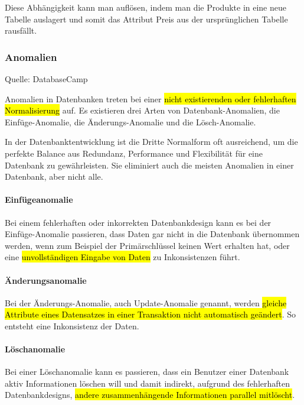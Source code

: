 Diese Abhängigkeit kann man auflösen, indem man die Produkte in eine neue Tabelle auslagert und somit das Attribut Preis aus der ursprünglichen Tabelle rausfällt.

\subsubsection{Anomalien}
\label{sec:Anomalien}

Quelle: DatabaseCamp \cite{anomalien}

Anomalien in Datenbanken treten bei einer \hl{nicht existierenden oder fehlerhaften Normalisierung} auf.
Es existieren drei Arten von Datenbank-Anomalien, die Einfüge-Anomalie, die Änderungs-Anomalie und die Lösch-Anomalie.

In der Datenbanktentwicklung ist die Dritte Normalform oft ausreichend, um die perfekte Balance aus Redundanz, Performance und Flexibilität für eine Datenbank zu gewährleisten. Sie eliminiert auch die meisten Anomalien in einer Datenbank, aber nicht alle.

\paragraph{Einfügeanomalie} Bei einem fehlerhaften oder inkorrekten Datenbankdesign kann es bei der Einfüge-Anomalie passieren, dass Daten gar nicht in die Datenbank übernommen werden, wenn zum Beispiel der Primärschlüssel keinen Wert erhalten hat, oder eine \hl{unvollständigen Eingabe von Daten} zu Inkonsistenzen führt.

\paragraph{Änderungsanomalie} Bei der Änderungs-Anomalie, auch Update-Anomalie genannt, werden \hl{gleiche Attribute eines Datensatzes in einer Transaktion nicht automatisch geändert}. So entsteht eine Inkonsistenz der Daten.

\paragraph{Löschanomalie} Bei einer Löschanomalie kann es passieren, dass ein Benutzer einer Datenbank aktiv Informationen löschen will und damit indirekt, aufgrund des fehlerhaften Datenbankdesigns, \hl{andere zusammenhängende Informationen parallel mitlöscht}.